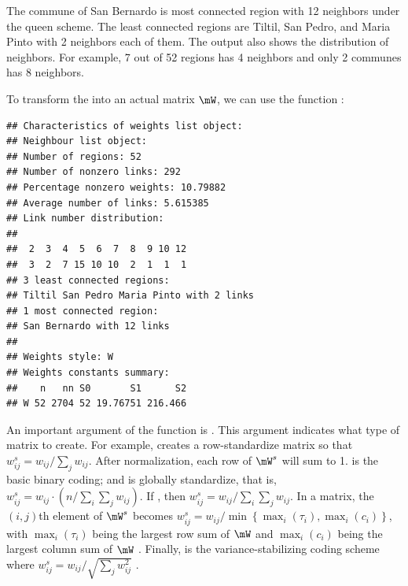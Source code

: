 The commune of San Bernardo is most connected region with 12 neighbors under the queen scheme. The least connected regions are Tiltil, San Pedro, and Maria Pinto with 2 neighbors each of them. The output also shows the distribution of neighbors.  For example, 7 out of 52 regions has 4 neighbors and only 2 communes has 8 neighbors.  

To transform the  into an actual matrix $\mW$, we can use the function :


\begin{knitrout}
\color{fgcolor}\begin{kframe}
\begin{alltt}
 \hlkwb{<-}   \hlstd{=} \hlstd{)}
\end{alltt}
\begin{verbatim}
## Characteristics of weights list object:
## Neighbour list object:
## Number of regions: 52 
## Number of nonzero links: 292 
## Percentage nonzero weights: 10.79882 
## Average number of links: 5.615385 
## Link number distribution:
## 
##  2  3  4  5  6  7  8  9 10 12 
##  3  2  7 15 10 10  2  1  1  1 
## 3 least connected regions:
## Tiltil San Pedro Maria Pinto with 2 links
## 1 most connected region:
## San Bernardo with 12 links
## 
## Weights style: W 
## Weights constants summary:
##    n   nn S0       S1      S2
## W 52 2704 52 19.76751 216.466
\end{verbatim}
\end{kframe}
\end{knitrout}

An important argument of the function is . This argument indicates what type of matrix to create. For example,  creates a row-standardize matrix so that $w^s_{ij} = w_{ij}/ \sum_j w_{ij}$. After normalization, each row of $\mW^s$ will sum to 1.  is the basic binary coding; and  is globally standardize, that is, $w^s_{ij} = w_{ij} \cdot (n/ \sum_{i}\sum_j w_{ij})$. If , then $w^s_{ij} = w_{ij}/ \sum_i\sum_j w_{ij}$. In a  matrix, the $(i,j)$th element of $\mW^s$  becomes $w^s_{ij} = w_{ij} / \min\left\lbrace \max_i(\tau_i), \max_i(c_i)\right\rbrace$, with $\max_i(\tau_i)$ being the largest row sum of $\mW$ and $\max_i(c_i)$ being the largest column sum of $\mW$ \citep{kelejian2010specification}. Finally,  is the variance-stabilizing coding scheme where $w^s_{ij} = w_{ij}/ \sqrt{\sum_j w_{ij} ^2}$ \citep{tiefelsdorf1999variance}. 

